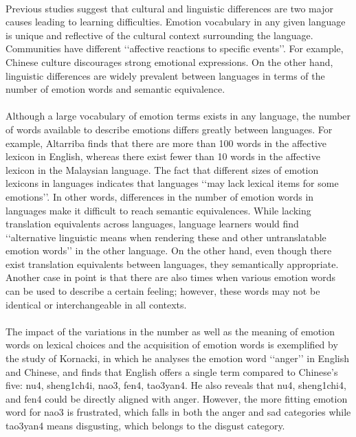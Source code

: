 \documentclass[a4paper,12pt,oneside]{article}
\begin{document}
\paragraph{}
Previous studies suggest that cultural and linguistic differences are two major causes leading to learning difficulties. Emotion vocabulary in any given language is unique and reflective of the cultural context surrounding the language. Communities have different ‘‘affective reactions to specific events’’. For example, Chinese culture discourages strong emotional expressions. On the other hand, linguistic differences are widely prevalent between languages in terms of the number of emotion words and semantic equivalence. 
\paragraph{}
Although a large vocabulary of emotion terms exists in any language, the number of words available to describe emotions differs greatly between languages. For example, Altarriba finds that there are more than 100 words in the affective lexicon in English, whereas there exist fewer than 10 words in the affective lexicon in the Malaysian language. The fact that different sizes of emotion lexicons in languages indicates that languages ‘‘may lack lexical items for some emotions’’. In other words, differences in the number of emotion words in languages make it difficult to reach semantic equivalences. While lacking translation equivalents across languages, language learners would find ‘‘alternative linguistic means when rendering these and other untranslatable emotion words’’ in the other language. On the other hand, even though there exist translation equivalents between languages, they semantically appropriate. Another case in point is that there are also times when various emotion words can be used to describe a certain feeling; however, these words may not be identical or interchangeable in all contexts.
\paragraph{}
The impact of the variations in the number as well as the meaning of emotion words on lexical choices and the acquisition of emotion words is exemplified by the study of Kornacki, in which he analyses the emotion word ‘‘anger’’ in English and Chinese, and finds that English offers a single term compared to Chinese’s five: nu4, sheng1ch4i, nao3, fen4, tao3yan4. He also reveals that nu4, sheng1chi4, and fen4 could be directly aligned with anger. However, the more fitting emotion word for nao3 is frustrated, which falls in both the anger and sad categories while tao3yan4 means disgusting, which belongs to the disgust category. 
\end{document}
